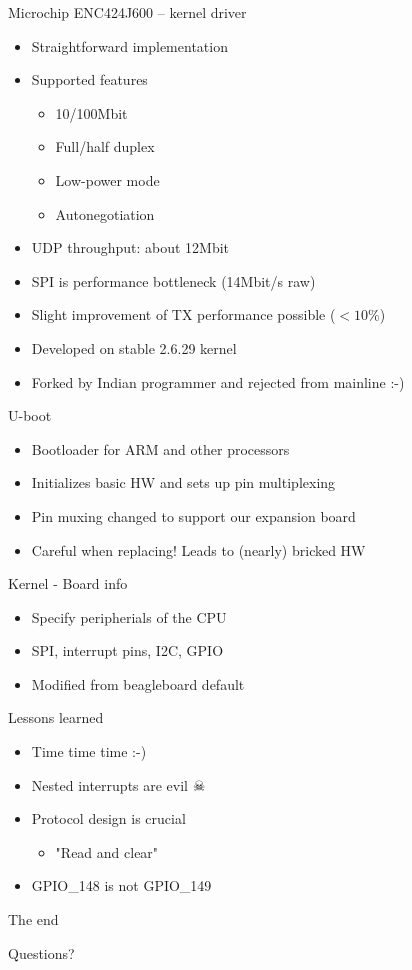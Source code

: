 \documentclass{beamer}
\begin{document}
\begin{frame}{Microchip ENC424J600 -- kernel driver}
\begin{itemize}
	\item Straightforward implementation
	\item Supported features
	\begin{itemize}
		\item 10/100Mbit
		\item Full/half duplex
		\item Low-power mode
		\item Autonegotiation
	\end{itemize}
	\item UDP throughput: about 12Mbit
	\item SPI is performance bottleneck (14Mbit/s raw)
	\item Slight improvement of TX performance possible (\( < 10\%\))
	\item Developed on stable 2.6.29 kernel
	\item Forked by Indian programmer and rejected from mainline :-)
\end{itemize}
\end{frame}

\begin{frame}{U-boot}
\begin{itemize}
	\item Bootloader for ARM and other processors
	\item Initializes basic HW and sets up pin multiplexing
	\item Pin muxing changed to support our expansion board
	\item Careful when replacing! Leads to (nearly) bricked HW
\end{itemize}
\end{frame}

\begin{frame}{Kernel - Board info}
\begin{itemize}
	\item Specify peripherials of the CPU
	\item SPI, interrupt pins, I2C, GPIO
	\item Modified from beagleboard default
\end{itemize}
\end{frame}

\begin{frame}{Lessons learned}
\begin{itemize}
	\item Time time time :-)
	\item Nested interrupts are evil \(\skull\)
	\item Protocol design is crucial
	\begin{itemize}
		\item "Read and clear"
	\end{itemize}
	\item GPIO\_148 is not GPIO\_149
\end{itemize}
\end{frame}

\begin{frame}{The end}
\begin{center}
Questions?
\end{center}
\end{frame}
\end{document}
